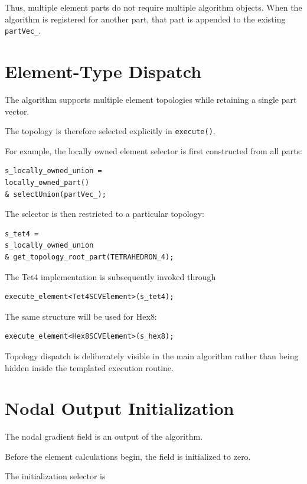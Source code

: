 \documentclass[11pt]{article}
\begin{document}
Thus, multiple element parts do not require multiple algorithm
objects.  When the algorithm is registered for another part, that
part is appended to the existing \texttt{partVec\_}.

\section{Element-Type Dispatch}

The algorithm supports multiple element topologies while retaining
a single part vector.

The topology is therefore selected explicitly in
\texttt{execute()}.

For example, the locally owned element selector is first constructed
from all parts:

\begin{verbatim}
s_locally_owned_union =
locally_owned_part()
& selectUnion(partVec_);
\end{verbatim}

The selector is then restricted to a particular topology:

\begin{verbatim}
s_tet4 =
s_locally_owned_union
& get_topology_root_part(TETRAHEDRON_4);
\end{verbatim}

The Tet4 implementation is subsequently invoked through

\begin{verbatim}
execute_element<Tet4SCVElement>(s_tet4);
\end{verbatim}

The same structure will be used for Hex8:

\begin{verbatim}
execute_element<Hex8SCVElement>(s_hex8);
\end{verbatim}

Topology dispatch is deliberately visible in the main algorithm
rather than being hidden inside the templated execution routine.

\section{Nodal Output Initialization}

The nodal gradient field is an output of the algorithm.

Before the element calculations begin, the field is initialized to
zero.

The initialization selector is
\end{document}
